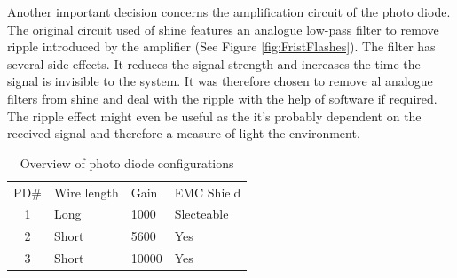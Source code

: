 Another important decision concerns the amplification circuit of the photo diode. The original circuit used of shine features an analogue low-pass filter to remove ripple introduced by the amplifier (See Figure \ref{fig:FristFlashes}). The filter has several side effects. It reduces the signal strength and increases the time the signal is invisible to the system. It was therefore chosen to remove al analogue filters from shine and deal with the ripple with the help of software if required. The ripple effect might even be useful as the it's probably dependent on the received signal and therefore a measure of light the environment.



\begin{table}[]
	\centering
	\label{tbl:PDs}
	\begin{tabular}{clll}
		PD\#                   & Wire length & Gain  & EMC Shield \\ \cline{2-4} 
		\multicolumn{1}{c|}{1} & Long        & 1000  & Slecteable \\
		\multicolumn{1}{c|}{2} & Short       & 5600  & Yes        \\
		\multicolumn{1}{c|}{3} & Short       & 10000 & Yes       
	\end{tabular}
	\caption{Overview of photo diode configurations}
\end{table}

